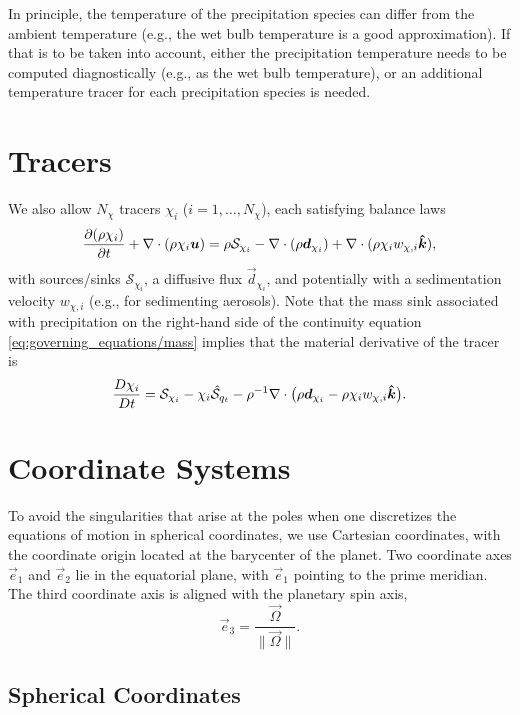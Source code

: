 \documentclass{report}
\begin{document}
In principle, the temperature of the precipitation species can differ from the ambient temperature (e.g., the wet bulb temperature is a good approximation). If that is to be taken into account, either the precipitation temperature needs to be computed diagnostically (e.g., as the wet bulb temperature), or an additional temperature tracer for each precipitation species is needed.

\section{Tracers}

We also allow $N_\chi$ tracers $\chi_i$ ($i=1, \dots, N_\chi$), each satisfying balance laws
\begin{equation}
\frac{\partial (\rho \chi_i)}{\partial t} + \nabla \cdot \left(\rho \chi_i \boldsymbol{{u}} \right) = \rho \mathcal{S}_{\chi_i} - \nabla \cdot (\rho \boldsymbol{{d}}_{\chi_i}) + \nabla \cdot (\rho \chi_{i} w_{\chi, i} \boldsymbol{{\hat k}}),   
\label{eq:tracers}
\end{equation}
with sources/sinks $\mathcal{S}_{\chi_i}$, a diffusive flux $\vec{d}_{\chi_i}$, and potentially with a sedimentation velocity $w_{\chi, i}$ (e.g., for sedimenting aerosols). Note that the mass sink associated with precipitation on the right-hand side of the continuity equation \eqref{eq:governing_equations/mass} implies that the material derivative of the tracer is 
\[
\frac{D\chi_i}{Dt} = \mathcal{S}_{\chi_i} - \chi_i \mathcal{\hat S}_{q_t} - \rho^{-1} \nabla \cdot \bigl(\rho \boldsymbol{{d}}_{\chi_i} - \rho \chi_{i} w_{\chi, i} \boldsymbol{{\hat k}}\bigr).
\]
 
\section{Coordinate Systems}

To avoid the singularities that arise at the poles when one discretizes the equations of motion in spherical coordinates, we use Cartesian coordinates, with the coordinate origin located at the barycenter of the planet. Two coordinate axes $\vec{e}_1$ and $\vec{e}_2$ lie in the equatorial plane, with $\vec{e}_1$ pointing to the prime meridian. The third coordinate axis is aligned with the planetary spin axis,
\[
\vec{e}_3 = \frac{\vec{\Omega}}{\|\vec{\Omega}\|}.
\]

\subsection{Spherical Coordinates}
\end{document}
